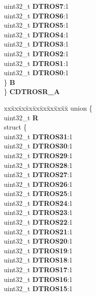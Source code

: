 \begin{DoxyCompactItemize}
\begin{tabbing}
\>\>uint32\_t {\bfseries DTROS7}:1\\
\>\>uint32\_t {\bfseries DTROS6}:1\\
\>\>uint32\_t {\bfseries DTROS5}:1\\
\>\>uint32\_t {\bfseries DTROS4}:1\\
\>\>uint32\_t {\bfseries DTROS3}:1\\
\>\>uint32\_t {\bfseries DTROS2}:1\\
\>\>uint32\_t {\bfseries DTROS1}:1\\
\>\>uint32\_t {\bfseries DTROS0}:1\\
\>\} {\bfseries B}\\
\} {\bfseries CDTROSR\_A}\\

\end{tabbing}\item 
\mbox{\label{structETPU__tag_a02f92745dd2014fb7b7f3ab1f1856914}} 
\begin{tabbing}
xx\=xx\=xx\=xx\=xx\=xx\=xx\=xx\=xx\=\kill
union \{\\
\>uint32\_t {\bfseries R}\\
\>struct \{\\
\>\>uint32\_t {\bfseries DTROS31}:1\\
\>\>uint32\_t {\bfseries DTROS30}:1\\
\>\>uint32\_t {\bfseries DTROS29}:1\\
\>\>uint32\_t {\bfseries DTROS28}:1\\
\>\>uint32\_t {\bfseries DTROS27}:1\\
\>\>uint32\_t {\bfseries DTROS26}:1\\
\>\>uint32\_t {\bfseries DTROS25}:1\\
\>\>uint32\_t {\bfseries DTROS24}:1\\
\>\>uint32\_t {\bfseries DTROS23}:1\\
\>\>uint32\_t {\bfseries DTROS22}:1\\
\>\>uint32\_t {\bfseries DTROS21}:1\\
\>\>uint32\_t {\bfseries DTROS20}:1\\
\>\>uint32\_t {\bfseries DTROS19}:1\\
\>\>uint32\_t {\bfseries DTROS18}:1\\
\>\>uint32\_t {\bfseries DTROS17}:1\\
\>\>uint32\_t {\bfseries DTROS16}:1\\
\>\>uint32\_t {\bfseries DTROS15}:1\\

\end{tabbing}
\end{DoxyCompactItemize}
